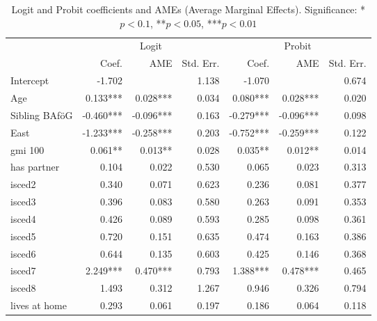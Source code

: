 \begin{table}[htbp]
\centering
\footnotesize
\caption{Logit and Probit coefficients and AMEs (Average Marginal Effects). Significance: *\( p < 0.1 \), **\( p < 0.05 \), ***\( p < 0.01 \)}
\label{tab:logit-probit-ame}
\begin{tabular}{lrrrrrr}
\toprule
             & \multicolumn{3}{c}{Logit}           & \multicolumn{3}{c}{Probit} \\
\cmidrule(lr){2-4} \cmidrule(lr){5-7}
             & Coef.    & AME      & Std. Err.   & Coef.    & AME      & Std. Err. \\
\midrule
Intercept               & -1.702    &            & 1.138     & -1.070    &            & 0.674     \\
Age                     & 0.133***  & 0.028***   & 0.034     & 0.080***  & 0.028***   & 0.020     \\
Sibling BAföG           & -0.460*** & -0.096***  & 0.163     & -0.279*** & -0.096***  & 0.098     \\
East                    & -1.233*** & -0.258***  & 0.203     & -0.752*** & -0.259***  & 0.122     \\
gmi 100                 & 0.061**   & 0.013**    & 0.028     & 0.035**   & 0.012**    & 0.014     \\
has partner             & 0.104     & 0.022      & 0.530     & 0.065     & 0.023      & 0.313     \\
isced2                  & 0.340     & 0.071      & 0.623     & 0.236     & 0.081      & 0.377     \\
isced3                  & 0.396     & 0.083      & 0.580     & 0.263     & 0.091      & 0.353     \\
isced4                  & 0.426     & 0.089      & 0.593     & 0.285     & 0.098      & 0.361     \\
isced5                  & 0.720     & 0.151      & 0.635     & 0.474     & 0.163      & 0.386     \\
isced6                  & 0.644     & 0.135      & 0.603     & 0.425     & 0.146      & 0.368     \\
isced7                  & 2.249***  & 0.470***   & 0.793     & 1.388***  & 0.478***   & 0.465     \\
isced8                  & 1.493     & 0.312      & 1.267     & 0.946     & 0.326      & 0.794     \\
lives at home           & 0.293     & 0.061      & 0.197     & 0.186     & 0.064      & 0.118     \\

\end{tabular}
\end{table}

